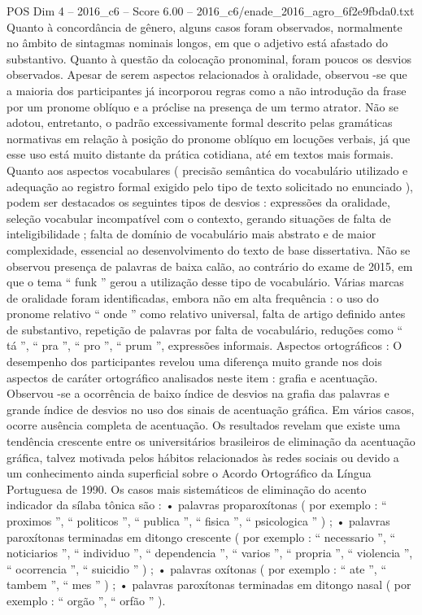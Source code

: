 \begin{textsample}{POS Dim 4 – 2016\_c6 – Score 6.00 – 2016\_c6/enade\_2016\_agro\_6f2e9fbda0.txt}
Quanto à concordância de gênero, alguns casos foram observados, normalmente no âmbito de sintagmas nominais longos, em que o adjetivo está afastado do substantivo.
Quanto à questão da colocação pronominal, foram poucos os desvios observados.
Apesar de serem aspectos relacionados à oralidade, observou -se que a maioria dos participantes já incorporou regras como a não introdução da frase por um pronome oblíquo e a próclise na presença de um termo atrator.
Não se adotou, entretanto, o padrão excessivamente formal descrito pelas gramáticas normativas em relação à posição do pronome oblíquo em locuções verbais, já que esse uso está muito distante da prática cotidiana, até em textos mais formais.
Quanto aos aspectos vocabulares ( precisão semântica do vocabulário utilizado e adequação ao registro formal exigido pelo tipo de texto solicitado no enunciado ), podem ser destacados os seguintes tipos de desvios : expressões da oralidade, seleção vocabular incompatível com o contexto, gerando situações de falta de inteligibilidade ; falta de domínio de vocabulário mais abstrato e de maior complexidade, essencial ao desenvolvimento do texto de base dissertativa.
Não se observou presença de palavras de baixa calão, ao contrário do exame de 2015, em que o tema “ funk ” gerou a utilização desse tipo de vocabulário.
Várias marcas de oralidade foram identificadas, embora não em alta frequência : o uso do pronome relativo “ onde ” como relativo universal, falta de artigo definido antes de substantivo, repetição de palavras por falta de vocabulário, reduções como “ tá ”, “ pra ”, “ pro ”, “ prum ”, expressões informais.
Aspectos ortográficos : O desempenho dos participantes revelou uma diferença muito grande nos dois aspectos de caráter ortográfico analisados neste item : grafia e acentuação.
Observou -se a ocorrência de baixo índice de desvios na grafia das palavras e grande índice de desvios no uso dos sinais de acentuação gráfica.
Em vários casos, ocorre ausência completa de acentuação.
Os resultados revelam que existe uma tendência crescente entre os universitários brasileiros de eliminação da acentuação gráfica, talvez motivada pelos hábitos relacionados às redes sociais ou devido a um conhecimento ainda superficial sobre o Acordo Ortográfico da Língua Portuguesa de 1990.
Os casos mais sistemáticos de eliminação do acento indicador da sílaba tônica são : • palavras proparoxítonas ( por exemplo : “ proximos ”, “ politicos ”, “ publica ”, “ fisica ”, “ psicologica ” ) ; • palavras paroxítonas terminadas em ditongo crescente ( por exemplo : “ necessario ”, “ noticiarios ”, “ individuo ”, “ dependencia ”, “ varios ”, “ propria ”, “ violencia ”, “ ocorrencia ”, “ suicidio ” ) ; • palavras oxítonas ( por exemplo : “ ate ”, “ tambem ”, “ mes ” ) ; • palavras paroxítonas terminadas em ditongo nasal ( por exemplo : “ orgão ”, “ orfão ” ).

\end{textsample}

